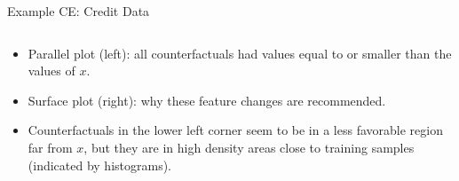 \documentclass[aspectratio=169]{../latex_main/tntbeamer}  %
\begin{document}
\begin{frame}{Example CE: Credit Data}
\begin{columns}
\begin{column}{0.5\textwidth}
		\end{column}
	\end{columns}
	
	\begin{itemize}
	    \item Parallel plot (left): all counterfactuals had values equal to or smaller than the values of $x$.
		\item Surface plot (right): why these feature changes are recommended. 
		\item Counterfactuals in the lower left corner seem to be in a less favorable region far from $x$, but they are in high density areas close to training samples (indicated by histograms).
	\end{itemize}
		
\end{frame}
\end{document}
